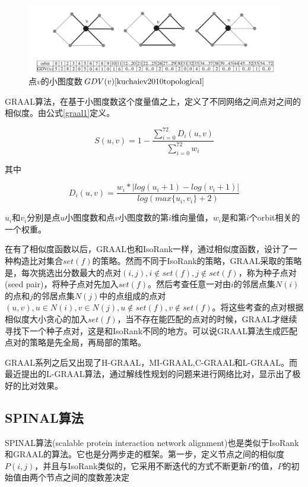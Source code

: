 \begin{figure}[htbp]
\centering
\includegraphics[width=\textwidth]{pic/orbitcount.png}
\caption{点$v$的小图度数$GDV(v)\cite{kuchaiev2010topological}$}\label{fig:orbitcount}
\end{figure}

GRAAL算法，在基于小图度数这个度量值之上，定义了不同网络之间点对之间的相似度。由公式\ref{graal1}定义。

\begin{equation}\label{graal1}
S(u,v)=1-\frac{\sum_{i=0}^{72}D_i(u,v)}{\sum_{i=0}^{72}w_i}
\end{equation}

其中

\begin{equation}\label{graal2}
D_i(u,v)=\frac{w_i*\left | log(u_i+1)-log(v_i+1) \right |}{log(max\{u_i,v_i\}+2)}
\end{equation}

$u_i$和$v_i$分别是点$u$小图度数和点$v$小图度数的第$i$维向量值，$w_i$是和第$i$个orbit相关的一个权重。

在有了相似度函数以后，GRAAL也和IsoRank一样，通过相似度函数，设计了一种构造比对集合$set(f)$的策略。然而不同于IsoRank的策略，GRAAL采取的策略是，每次挑选出分数最大的点对$(i,j),i\notin set(f),j\notin set(f)$，称为种子点对(seed pair)，将种子点对先加入$set(f)$。然后考查任意一对由$i$的邻居点集$N(i)$的点和$j$的邻居点集$N(j)$中的点组成的点对$(u,v),u\in N(i),v\in N(j),u\notin set(f),v\notin set(f)$。将这些考查的点对根据相似度大小贪心的加入$set(f)$，当不存在能匹配的点对的时候，GRAAL才继续寻找下一个种子点对，这是和IsoRank不同的地方。可以说GRAAL算法生成匹配点对的策略是先全局，再局部的策略。

GRAAL系列之后又出现了H-GRAAL\cite{milenkovic2010optimal}，MI-GRAAL\cite{kuchaiev2011integrative},C-GRAAL\cite{memivsevic2012c}和L-GRAAL\cite{malod2015graal}。而最近提出的L-GRAAL\cite{malod2015graal}算法，通过解线性规划的问题来进行网络比对，显示出了极好的比对效果。

\subsection{SPINAL算法}
SPINAL算法(scalable protein interaction network alignment)也是类似于IsoRank和GRAAL的算法。它也是分两步走的框架。第一步，定义节点之间的相似度$P(i,j)$，并且与IsoRank类似的，它采用不断迭代的方式不断更新$P$的值，$P$的初始值由两个节点之间的度数差决定

